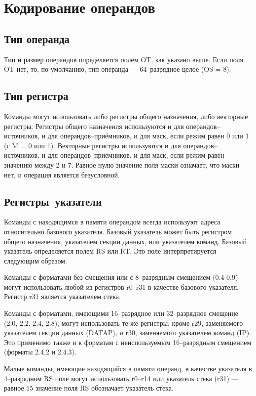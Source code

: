 \documentclass[forwardcom.tex]{subfiles}
\begin{document}
\section{Кодирование операндов}
\subsection{Тип операнда}
Тип и размер операндов определяется полем OT, как указано выше. Если поля OT нет, то, по умолчанию, тип операнда --- 64--разрядное целое (OS = 8). 


\subsection{Тип регистра}
Команды могут использовать либо регистры общего назначения, либо векторные регистры. Регистры общего назначения используются и для операндов--источников, и для операндов--приёмников, и для маск, если режим равен 0 или 1 (с M = 0 или 1). Векторные регистры используются и для операндов--источников, и для операндов--приёмников, и для маск, если режим равен значению между 2 и 7. Равное нулю значение поля маски означает, что маски нет, и операция является безусловной.

\subsection{Регистры--указатели}
Команды с находящимся в памяти операндом всегда используют адреса относительно базового указателя. Базовый указатель может быть регистром общего назначения, указателем секции данных, или указателем команд. Базовый указатель определяется полем RS или RT. Это поле интерпретируется следующим образом.

Команды с форматами без смещения или с 8--разрядным смещением (0.4-0.9) могут использовать любой из регистров r0--r31 в качестве базового указателя. Регистр r31 является указателем стека.

Команды с форматами, имеющими 16--разрядное или 32--разрядное смещение (2.0, 2.2, 2.4, 2.8), могут использовать те же регистры, кроме r29, заменяемого указателем секции данных (DATAP), и r30, заменяемого указателем команд (IP). Это применимо также и к форматам с неиспользуемым 16--разрядным смещением (форматы 2.4.2 и 2.4.3).

Малые команды, имеющие находящийся в памяти операнд, в качестве указателя в 4--разрядном RS поле могут использовать r0--r14 или указатель стека (r31) --- равное 15 значение поля RS обозначает указатель стека.
\end{document}
